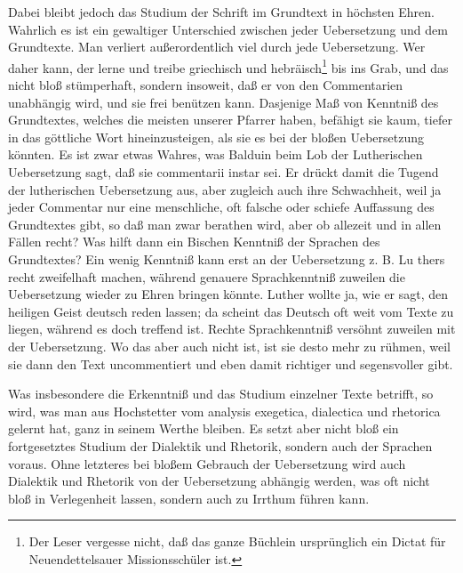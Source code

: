 Dabei bleibt jedoch das Studium der Schrift im Grundtext in höchsten Ehren. Wahrlich es ist ein gewaltiger Unterschied zwischen jeder Uebersetzung und dem Grundtexte. Man verliert außerordentlich viel durch jede Uebersetzung. Wer daher kann, der lerne und treibe griechisch und hebräisch\footnote{Der Leser vergesse nicht, daß das ganze Büchlein ursprünglich ein Dictat für Neuendettelsauer Missionsschüler ist.} bis ins Grab, und das nicht bloß stümperhaft, sondern insoweit, daß er von den Commentarien unabhängig wird, und sie frei benützen kann. Dasjenige Maß von Kenntniß des Grundtextes, welches die meisten unserer Pfarrer haben, befähigt sie kaum, tiefer in das göttliche Wort hineinzusteigen, als sie es bei der bloßen Uebersetzung könnten. Es ist zwar etwas Wahres, was Balduin beim Lob der Lutherischen Uebersetzung sagt, daß sie commentarii instar sei. Er drückt damit die Tugend der lutherischen Uebersetzung aus, aber zugleich auch ihre Schwachheit, weil ja jeder Commentar nur eine menschliche, oft falsche oder schiefe Auffassung des Grundtextes gibt, so daß man zwar berathen wird, aber ob allezeit und in allen Fällen recht? Was hilft dann ein Bischen Kenntniß der Sprachen des Grundtextes? Ein wenig Kenntniß kann erst an der Uebersetzung z. B. Lu%
thers recht zweifelhaft machen, während genauere Sprachkenntniß zuweilen die Uebersetzung wieder zu Ehren bringen könnte. Luther wollte ja, wie er sagt, den heiligen Geist deutsch reden lassen; da scheint das Deutsch oft weit vom Texte zu liegen, während es doch treffend ist. Rechte Sprachkenntniß versöhnt zuweilen mit der Uebersetzung. Wo das aber auch nicht ist, ist sie desto mehr zu rühmen, weil sie dann den Text uncommentiert und eben damit richtiger und segensvoller gibt.

Was insbesondere die Erkenntniß und das Studium einzelner Texte betrifft, so wird, was man aus Hochstetter vom analysis exegetica, dialectica und rhetorica gelernt hat, ganz in seinem Werthe bleiben. Es setzt aber nicht bloß ein fortgesetztes Studium der Dialektik und Rhetorik, sondern auch der Sprachen voraus. Ohne letzteres bei bloßem Gebrauch der Uebersetzung wird auch Dialektik und Rhetorik von der Uebersetzung abhängig werden, was oft nicht bloß in Verlegenheit lassen, sondern auch zu Irrthum führen kann.

